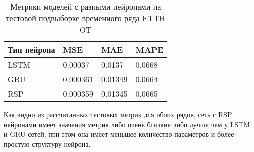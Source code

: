 \documentclass[11pt]{article}
\begin{document}
\begin{table}[H]
\caption{Метрики моделей с разными нейронами на тестовой подвыборке временного ряда ETTH OT}
\begin{tabular}{ |p{3cm}|p{3cm}|p{3cm}|p{3cm}|  }
 \hline
  Тип нейрона & MSE &  MAE & MAPE \\
 \hline
 LSTM & 0.00037 & 0.0137 & 0.0668 \\
 \hline
 GRU & 0.000361 & 0.01349 & 0.0664 \\
 \hline 
 RSP & 0.000359 & 0.01345 & 0.0665 \\
 \hline
\end{tabular}
\end{table}

Как видно из рассчитанных тестовых метрик для обоих рядов, сеть с RSP нейронами имеет значения метрик либо очень близкие либо лучше чем у LSTM и GRU сетей, при этом она имеет меньшее количество параметров и более простую структуру нейрона. 
\end{document}
